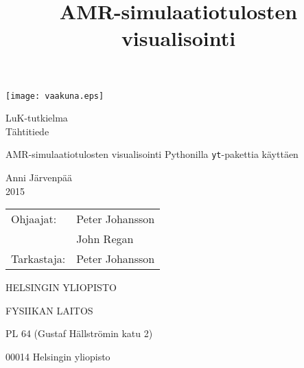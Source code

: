 \documentclass[11pt,a4paper,twoside]{report}
\begin{document}
\begin{titlepage}
\setcounter{page}{1}

\begin{center}

\vspace*{4cm}
\texttt{[image: vaakuna.eps]}

\vspace*{2cm}

LuK-tutkielma \\
Tähtitiede

\vspace{2.0cm} 
{\Large \bf
  \rule{0pt}{3ex}AMR-simulaatiotulosten visualisointi Pythonilla \texttt{yt}-pakettia käyttäen
}

\title{
AMR-simulaatiotulosten visualisointi
}

\vspace{2.0cm} 
Anni Järvenpää \\
2015

\vspace{1.5cm} 
\begin{tabular}{ll}	Ohjaajat: & 	Peter Johansson \\
							& John Regan \\
			Tarkastaja: & Peter Johansson 
\end{tabular}

\vspace{1.5cm} HELSINGIN YLIOPISTO

FYSIIKAN LAITOS

\vspace{0.5cm} PL 64 (Gustaf Hällströmin katu 2)

00014 Helsingin yliopisto

\end{center}

\end{titlepage}
\end{document}
